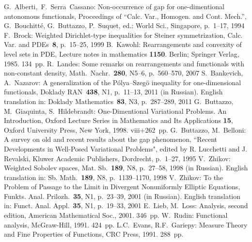 \begin{thebibliography}{99}
 G.~Alberti,~F.~Serra~Cassano: Non-occurrence of gap for one-dimentional autonomous functionals,
Proceedings of ``Calc. Var., Homogen. and Cont. Mech.'', G.~Bouchitt\'e, G.~Buttazzo, P.~Suquet, ed.: World Sci., Singapore, p.~1--17, 1994
 F.~Brock: Weighted Dirichlet-type inequalities for Steiner symmetrization,
Calc. Var. and PDEs~{\bf8}, p.~15--25, 1999
 B.~Kawohl: Rearrangements and convexity of level sets in PDE,
Lecture notes in mathematics {\bf1150}. Berlin; Springer Verlag, 1985. 134~pp.
 R.~Landes: Some remarks on rearrangements and functionals with non-constant density,
Math.~Nachr.~{\bf280}, N5--6, p.~560--570, 2007
 S.~Bankevich, A.~Nazarov: A generalization of the P\'olya--Szeg\"o inequality for one-dimensional functionals,
Doklady RAN~{\bf438}, N1, p.~11--13, 2011 (in Russian).
English translation in:
Doklady Mathematics~{\bf83}, N3, p.~287--289, 2011
 G.~Buttazzo, M.~Giaquinta, S.~Hildebrandt: One-Dimentional Variational Problems. An Introduction,
Oxford Lecture Series in Mathematics and Its Applications {\bf15},
Oxford University Press, New York, 1998. viii+262~pp.
 G.~Buttazzo, M.~Belloni: A survey on old and recent results about the
gap phenomenon,
``Recent Developments in Well-Posed Variational Problems", edited by R. Lucchetti and J. Revalski,
Kluwer Academic Publishers, Dordrecht, p.~1--27, 1995
 V.~Zhikov: Weighted Sobolev spaces,
Mat. Sb.~{\bf189}, N8, p.~27--58, 1998 (in Russian).
English translation in:
Sb. Math.~{\bf189}, N8, p.~1139--1170, 1998
 V.~Zhikov: To the Problem of Passage to the Limit in Divergent Nonuniformly Elliptic Equations,
Funkts. Anal. Prilozh.~{\bf35}, N1, p.~23--39, 2001 (in Russian).
English translation in:
Funct. Anal. Appl.~{\bf35}, N1, p.~19--33, 2001
 E.~Lieb, M.~Loss: Analysis, second edition,
American Mathematical Soc., 2001. 346~pp.
 W.~Rudin: Functional analysis,
McGraw-Hill, 1991. 424~pp.
 L.C.~Evans, R.F.~Gariepy: Measure Theory and Fine Properties of Functions,
CRC Press, 1991. 288~pp.

\end{thebibliography}
